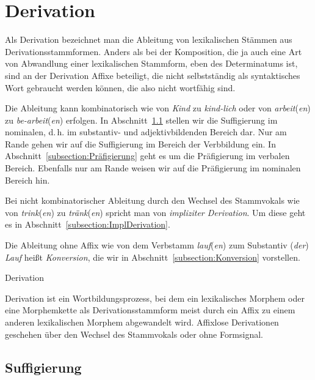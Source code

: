 \section{Derivation}\label{section:Derivation}
    
Als Derivation bezeichnet man die Ableitung von lexikalischen Stämmen aus Derivationsstammformen. Anders als bei der Komposition, die ja auch eine Art von Abwandlung einer lexikalischen Stammform, eben des Determinatums ist, sind an der Derivation Affixe beteiligt, die nicht selbstständig als syntaktisches Wort gebraucht werden können, die also nicht wortfähig sind. 

Die Ableitung kann kombinatorisch wie von \textit{Kind} zu \textit{kind-lich} oder von \textit{arbeit}(\textit{en}) zu \textit{be-arbeit}(\textit{en})  erfolgen. In Abschnitt~\ref{subsection:Suffigierung} stellen wir die Suffigierung im nominalen, d.\,h. im substantiv- und adjektivbildenden Bereich dar. Nur am Rande gehen wir auf die Suffigierung im Bereich der Verbbildung ein. In Abschnitt~\ref{subsection:Präfigierung} geht es um die Präfigierung im verbalen Bereich. Ebenfalls nur am Rande weisen wir auf die Präfigierung im nominalen Bereich hin. 

Bei nicht kombinatorischer Ableitung durch den Wechsel des Stammvokals wie von \textit{trink}(\textit{en}) zu \textit{tränk}(\textit{en}) spricht man von \textit{impliziter Derivation}. Um diese geht es in Abschnitt~\ref{subsection:ImplDerivation}. 

Die Ableitung ohne Affix wie von dem Verbstamm \textit{lauf}(\textit{en}) zum Substantiv (\textit{der}) \textit{Lauf} heißt \textit{Konversion}, die wir in Abschnitt~\ref{subsection:Konversion} vorstellen. 

\begin{Definition}{Derivation}
    
\noindent Derivation ist ein Wortbildungsprozess, bei dem ein lexikalisches Morphem oder eine Morphemkette als Derivationsstammform meist durch ein Affix zu einem anderen lexikalischen Morphem abgewandelt wird. Affixlose Derivationen geschehen über den Wechsel des Stammvokals oder ohne Formsignal.  
\end{Definition}



\subsection{Suffigierung}\label{subsection:Suffigierung}

